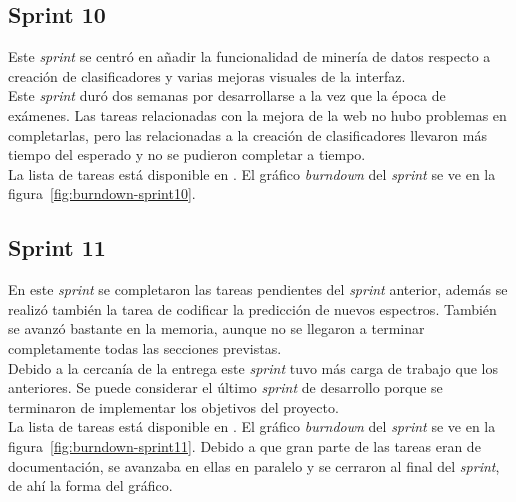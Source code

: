 \subsection{Sprint 10}
Este \textit{sprint} se centró en añadir la funcionalidad de minería de datos
respecto a creación de clasificadores y varias mejoras visuales de la
interfaz.\\

Este \textit{sprint} duró dos semanas por desarrollarse a la vez que la época de
exámenes. Las tareas relacionadas con la mejora de la web no hubo problemas en
completarlas, pero las relacionadas a la creación de clasificadores llevaron más
tiempo del esperado y no se pudieron completar a tiempo.\\

La lista de tareas está disponible en
. El gráfico \textit{burndown} del \textit{sprint} se ve en la
figura~\ref{fig:burndown-sprint10}.\\


\subsection{Sprint 11}
En este \textit{sprint} se completaron las tareas pendientes del \textit{sprint}
anterior, además se realizó también la tarea de codificar la predicción de 
nuevos espectros. También se avanzó bastante en la memoria, aunque no se 
llegaron a terminar completamente todas las secciones previstas.\\

Debido a la cercanía de la entrega este \textit{sprint} tuvo más carga de
trabajo que los anteriores. Se puede considerar el último \textit{sprint} de
desarrollo porque se terminaron de implementar los objetivos del proyecto.\\

La lista de tareas está disponible en
. El gráfico \textit{burndown} del \textit{sprint} se ve en la
figura~\ref{fig:burndown-sprint11}. Debido a que gran parte de las tareas eran
de documentación, se avanzaba en ellas en paralelo y se cerraron al final del
\textit{sprint}, de ahí la forma del gráfico.\\


